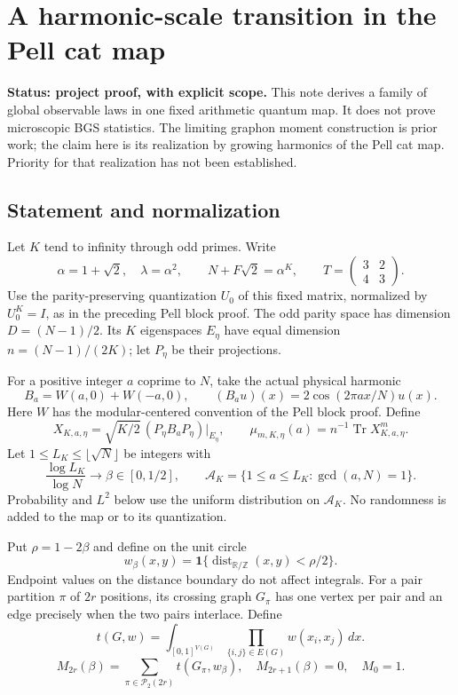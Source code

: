 \hypertarget{pell-harmonic-a-harmonic-scale-transition-in-the-pell-cat-map}{%
\section{A harmonic-scale transition in the Pell cat map}\label{pell-harmonic-a-harmonic-scale-transition-in-the-pell-cat-map}}

\textbf{Status: project proof, with explicit scope.} This note derives a family of
global observable laws in one fixed arithmetic quantum map. It does not prove
microscopic BGS statistics. The limiting graphon moment construction is prior
work; the claim here is its realization by growing harmonics of the Pell cat
map. Priority for that realization has not been established.

\hypertarget{pell-harmonic-statement-and-normalization}{%
\subsection{Statement and normalization}\label{pell-harmonic-statement-and-normalization}}

Let \(K\) tend to infinity through odd primes. Write
\[
 \alpha=1+\sqrt2,\quad \lambda=\alpha^2,\qquad
 N+F\sqrt2=\alpha^K,\qquad T=\begin{pmatrix}3&2\\4&3\end{pmatrix}.
\]
Use the parity-preserving quantization \(U_0\) of this fixed matrix, normalized
by \(U_0^K=I\), as in the preceding Pell block proof.
The odd parity space has dimension \(D=(N-1)/2\). Its \(K\) eigenspaces
\(E_\eta\) have equal dimension \(n=(N-1)/(2K)\); let \(P_\eta\) be their projections.

For a positive integer \(a\) coprime to \(N\), take the actual physical harmonic
\[
 B_a=W(a,0)+W(-a,0),\qquad
 (B_a u)(x)=2\cos(2\pi ax/N)u(x).
\]
Here \(W\) has the modular-centered convention of the Pell block proof.
Define
\[
 X_{K,a,\eta}=\sqrt{K/2}\,(P_\eta B_aP_\eta)|_{E_\eta},
 \qquad \mu_{m,K,\eta}(a)=n^{-1}\operatorname{Tr}X_{K,a,\eta}^m.       \tag{H1}
\]
Let \(1\le L_K\le\lfloor\sqrt N\rfloor\) be integers with
\[
 \frac{\log L_K}{\log N}\longrightarrow\beta\in[0,1/2],
 \qquad \mathcal A_K=\{1\le a\le L_K:\gcd(a,N)=1\}.                 \tag{H2}
\]
Probability and \(L^2\) below use the uniform distribution on \(\mathcal A_K\).
No randomness is added to the map or to its quantization.

Put \(\rho=1-2\beta\) and define on the unit circle
\[
 w_\beta(x,y)=\mathbf1\{\operatorname{dist}_{\mathbb R/\mathbb Z}(x,y)
                                  <\rho/2\}.                    \tag{H3}
\]
Endpoint values on the distance boundary do not affect integrals. For a pair
partition \(\pi\) of \(2r\) positions, its crossing graph \(G_\pi\) has one vertex
per pair and an edge precisely when the two pairs interlace. Define
\[
 t(G,w)=\int_{[0,1]^{V(G)}}\prod_{\{i,j\}\in E(G)}w(x_i,x_j)\,dx .
\]
\[
 M_{2r}(\beta)=\sum_{\pi\in\mathcal P_2(2r)}t(G_\pi,w_\beta),
 \quad M_{2r+1}(\beta)=0,\quad M_0=1.                            \tag{H4}
\]

